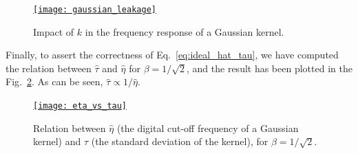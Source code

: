 \documentclass{article}
\begin{document}
\begin{figure}
  \centering
  \href{https://nbviewer.org/github/vicente-gonzalez-ruiz/denoising/blob/main/notebooks/gaussian_leakage.ipynb\#Gaussian_leakage}{\texttt{[image: gaussian\_leakage]}}
  \caption{Impact of $k$ in the frequency response of a Gaussian
    kernel.\label{fig:gaussian_leakage}}
\end{figure}

Finally, to assert the correctness of Eq.~\ref{eq:ideal_hat_tau}, we
have computed the relation between $\hat{\tau}$ and $\hat{\eta}$ for
$\beta=1/\sqrt{2}$, and the result has been plotted in the
Fig.~\ref{fig:eta_vs_tau}. As can be seen, $\hat{\tau}\propto 1/\hat{\eta}$.

\begin{figure}
  \centering
  \href{https://nbviewer.org/github/vicente-gonzalez-ruiz/denoising/blob/main/notebooks/eta_vs_tau.ipynb\#Eta_vs_tau}{\texttt{[image: eta\_vs\_tau]}}
  \caption{Relation between $\hat\eta$ (the digital cut-off frequency
    of a Gaussian kernel) and $\hat\tau$ (the standard deviation of
    the kernel), for $\beta=1/\sqrt{2}$.\label{fig:eta_vs_tau}}
\end{figure}

\end{document}

